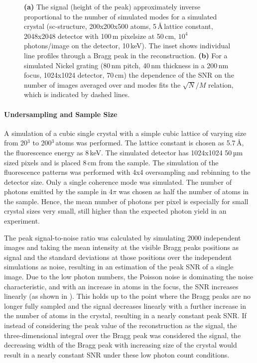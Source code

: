 \begin{figure}
	\caption[SNR dependence on the number of modes and images]{
		\textbf{(a)} The signal (height of the peak) approximately inverse proportional to the number of simulated modes for a simulated crystal
		(sc-structure, 200x200x500 atoms, 5\,\AA\,lattice constant, 2048x2048 detector with 100\,\textmu m pixelsize at 50\,cm, $10^4$ photons/image on the detector, 10\,keV). The inset shows individual line profiles through a Bragg peak in the reconstruction. \textbf{(b)} For a simulated Nickel grating (80\,nm pitch, 40\,nm thickness in a 200\,nm focus, 1024x1024 detector, 70\,cm) the dependence of the SNR on the number of images averaged over and modes fits the $\sqrt{N}/M$ relation, which is indicated by dashed lines.}
\end{figure}

\paragraph{Undersampling and  Sample Size}


A simulation of a cubic single crystal with a simple cubic lattice of varying size from 20$^3$ to 200$^3$\,atoms was performed. The lattice constant is chosen as 5.7\,\AA, the fluorescence energy as 8\,keV. The simulated detector has 1024x1024 50\,µm sized pixels and is placed 8\,cm from the  sample. The simulation of the fluorescence patterns was performed with 4x4 oversampling and rebinning to the detector size. Only a single coherence mode was simulated. The number of photons emitted by the sample in 4$\pi$ was chosen as half the number of atoms in the sample. Hence, the mean number of photons per pixel is especially for small crystal sizes very small, still higher than the expected photon yield in an experiment.

The peak signal-to-noise ratio was calculated by simulating 2000 independent images and taking the mean intensity at the visible Bragg peaks positions as signal and the standard deviations at those positions over the independent simulations as noise, resulting in an estimation of the peak SNR of a single image.
Due to the low photon numbers, the Poisson noise is dominating the noise characteristic, and with an increase in atoms in the focus, the SNR increases linearly (as shown in ). This holds up to the point where the Bragg peaks are no longer fully sampled and the signal decreases linearly with a further increase in the number of atoms in the crystal, resulting in a nearly constant peak SNR.
If instead of considering the peak value of the reconstruction as the signal, the three-dimensional integral over the Bragg peak was considered the signal, the decreasing width of the Bragg peak with increasing size of the crystal would result in a nearly constant SNR under these low photon count conditions. 




